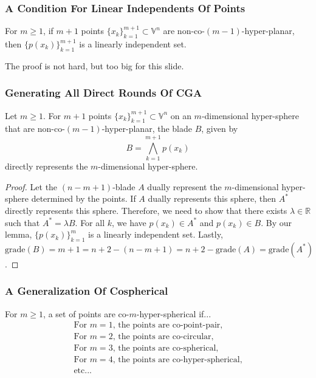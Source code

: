 \documentclass{beamer}
\newcommand{\V}{\mathbb{V}}
\newcommand{\R}{\mathbb{R}}
\newcommand{\grade}{\mbox{grade}}
\begin{document}
\begin{frame}
\frametitle{A Condition For Linear Independents Of Points}
\pause
\begin{lemma}
For $m\geq 1$, if $m+1$ points $\{x_k\}_{k=1}^{m+1}\subset\V^n$ are non-co-$(m-1)$-hyper-planar,
then $\{p(x_k)\}_{k=1}^{m+1}$ is a linearly independent set.
\end{lemma}\pause
The proof is not hard, but too big for this slide.
\end{frame}

\begin{frame}
\frametitle{Generating All \alert{Direct Rounds} Of CGA}
\pause
Let $m\geq 1$.
For $m+1$ points $\{x_k\}_{k=1}^{m+1}\subset\V^n$ on an $m$-dimensional
hyper-sphere that are non-co-$(m-1)$-hyper-planar,
the blade $B$, given by
\begin{equation*}
B = \bigwedge_{k=1}^{m+1} p(x_k)
\end{equation*}
\alert{directly} represents the $m$-dimensional hyper-sphere.\pause
\begin{proof}
Let the $(n-m+1)$-blade $A$ \alert{dually} represent the $m$-dimensional hyper-sphere determined by the points.
If $A$ \alert{dually} represents this sphere, then $A^*$ \alert{directly} represents this sphere.
Therefore, we need to show that there exists $\lambda\in\R$ such that $A^*=\lambda B$.
For all $k$, we have $p(x_k)\in A^*$ and $p(x_k)\in B$.
By our lemma, $\{p(x_k)\}_{k=1}^m$ is a linearly independent set.
Lastly, $\grade(B) = m+1 = n+2-(n-m+1) = n+2-\grade(A) = \grade(A^*)$.
\end{proof}
\end{frame}

\begin{frame}
\frametitle{A Generalization Of Cospherical}
\pause
\begin{definition}
For $m\geq 1$, a set of points are \alert{co-$m$-hyper-spherical} if...
\begin{equation*}
\begin{array}{l}
\mbox{For $m=1$, the points are co-point-pair,} \\
\mbox{For $m=2$, the points are co-circular,} \\
\mbox{For $m=3$, the points are co-spherical,} \\
\mbox{For $m=4$, the points are co-hyper-spherical,} \\
\mbox{etc...}
\end{array}
\end{equation*}
\end{definition}
\end{frame}
\end{document}
